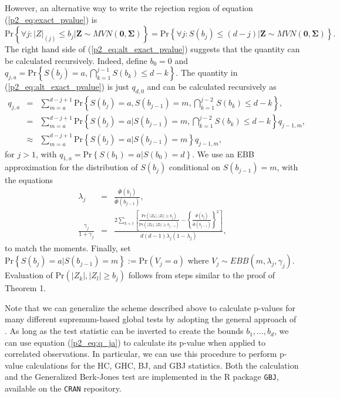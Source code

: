 \documentclass[12pt]{article}
\begin{document}
However, an alternative way to write the rejection region of equation (\ref{p2_eq:exact_pvalue}) is
\begingroup
	\makeatletter\def\f@size{11}\check@mathfonts
	\begin{equation}
	\text{Pr} \left\{ \forall j:|Z|_{(j)}\leq b_{j}\bigg|\mathbf{Z}\sim MVN(\mathbf{0},\boldsymbol{\Sigma})\right\} =\text{Pr}\left\{ \forall j:S(b_{j})\leq(d-j)\bigg|\mathbf{Z}\sim MVN(\mathbf{0},\boldsymbol{\Sigma})\right\}.
	\label{p2_eq:alt_exact_pvalue}
	\end{equation}
\endgroup
The right hand side of (\ref{p2_eq:alt_exact_pvalue}) suggests that the quantity can be calculated recursively.  
Indeed, define $b_{0}=0$ and $q_{j,a}=\text{Pr}\left\{ S(b_{j})=a,\bigcap_{k=1}^{j-1}S(b_{k})\leq d-k\right\}$.  
The quantity in (\ref{p2_eq:alt_exact_pvalue}) is just $q_{d,0}$ and can be calculated recursively as
\begin{eqnarray}
q_{j,a}  & = & \sum_{m=a}^{d-j+1}\text{Pr}\left\{ S(b_{j})=a,S(b_{j-1})=m,\bigcap_{k=1}^{j-2}S(b_{k})\leq d-k\right\}, \nonumber\\
 & = & \sum_{m=a}^{d-j+1}\text{Pr}\left\{ S(b_{j})=a \bigg| S(b_{j-1})=m,\bigcap_{k=1}^{j-2}S(b_{k})\leq d-k\right\} q_{j-1,m}, \nonumber\\
 & \approx & \sum_{m=a}^{d-j+1}\text{Pr}\left\{ S(b_{j})=a \bigg| S(b_{j-1})=m\right\} q_{j-1,m},
 \label{p2_eq:q_ja}
\end{eqnarray}
for $j>1$, with $q_{1,a}=\text{Pr} \left\{S(b_{1})=a | S(b_{0})=d\right\}$. We use an EBB approximation for the distribution of $S(b_{j})$ conditional on $S(b_{j-1})=m$, with the equations
\begin{eqnarray*}
\lambda_{j} & = & \frac{\bar{\Phi}(b_{j})}{\bar{\Phi}(b_{j-1})}, \\
\frac{\gamma_{j}}{1+\gamma_{j}} & = & \frac{2\sum_{k<l}\left[\frac{\text{Pr}\left( |Z_{k}|,|Z_{l}|\geq b_{j}\right) }{\text{Pr}\left( |Z_{k}|,|Z_{l}|\geq b_{j-1}\right) }-\left\{ \frac{\bar{\Phi}(b_{j})}{\bar{\Phi}(b_{j-1})}\right\} ^{2}\right]}{d(d-1)\lambda_{j}(1-\lambda_{j})},
\end{eqnarray*}
to match the moments.  
Finally, set $\text{Pr}\left\{ S(b_{j})=a|S(b_{j-1})=m\right\} := 
\text{Pr}\left(V_{j}=a\right)$ where $V_{j}\sim EBB(m, \lambda_{j},\gamma_{j})$.
Evaluation of $\text{Pr}\left(|Z_{k}|,|Z_{l}|\geq b_{j}\right)$ follows from steps similar to the proof of Theorem 1.


Note that we can generalize the scheme described above to calculate
p-values for many different supremum-based global tests by adopting the
general approach of \citet{boundary_crossing}. 
As long as the test statistic can be inverted to create the bounds $b_{1},...,b_{d}$, 
we can use equation (\ref{p2_eq:q_ja}) to calculate its p-value when applied to correlated observations.  
In particular, we can use this procedure to perform p-value calculations for the  
HC, GHC, BJ, and GBJ statistics.
Both the calculation and the Generalized Berk-Jones test are implemented in the 
R package \verb|GBJ|, available on the \verb|CRAN| repository.
\end{document}
